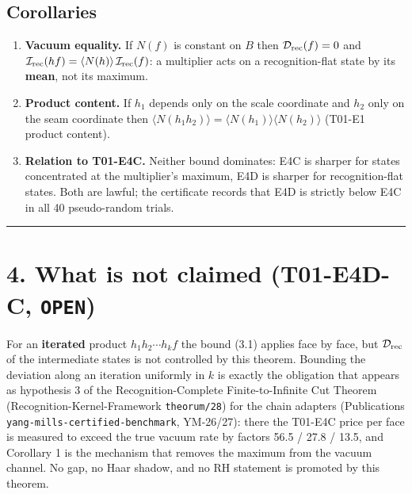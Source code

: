 \hypertarget{corollaries}{%
\subsection{Corollaries}\label{corollaries}}

\begin{enumerate}
\def\labelenumi{\arabic{enumi}.}
\tightlist
\item
  \textbf{Vacuum equality.} If \(N(f)\) is constant on \(B\) then
  \(\mathcal D_{\rm rec}(f)=0\) and
  \(\mathcal I_{\rm rec}(hf)=\langle N(h)\rangle\,\mathcal I_{\rm rec}(f)\):
  a multiplier acts on a recognition-flat state by its \textbf{mean}, not its
  maximum.
\item
  \textbf{Product content.} If \(h_1\) depends only on the scale coordinate and
  \(h_2\) only on the seam coordinate then
  \(\langle N(h_1h_2)\rangle=\langle N(h_1)\rangle\langle N(h_2)\rangle\)
  (T01-E1 product content).
\item
  \textbf{Relation to T01-E4C.} Neither bound dominates: E4C is sharper for
  states concentrated at the multiplier's maximum, E4D is sharper for
  recognition-flat states. Both are lawful; the certificate records that
  E4D is strictly below E4C in all 40 pseudo-random trials.
\end{enumerate}

\begin{center}\rule{0.5\linewidth}{0.5pt}\end{center}

\hypertarget{what-is-not-claimed-t01-e4d-c-open}{%
\section{\texorpdfstring{4. What is not claimed (T01-E4D-C, \texttt{OPEN})}{4. What is not claimed (T01-E4D-C, OPEN)}}\label{what-is-not-claimed-t01-e4d-c-open}}

For an \textbf{iterated} product \(h_1h_2\cdots h_k f\) the bound (3.1) applies
face by face, but \(\mathcal D_{\rm rec}\) of the intermediate states is not
controlled by this theorem. Bounding the deviation along an iteration
uniformly in \(k\) is exactly the obligation that appears as hypothesis 3 of
the Recognition-Complete Finite-to-Infinite Cut Theorem
(Recognition-Kernel-Framework \texttt{theorum/28}) for the chain adapters
(Publications \texttt{yang-mills-certified-benchmark}, YM-26/27): there the
T01-E4C price per face is measured to exceed the true vacuum rate by factors
56.5 / 27.8 / 13.5, and Corollary 1 is the mechanism that removes the
maximum from the vacuum channel. No gap, no Haar shadow, and no RH statement
is promoted by this theorem.

